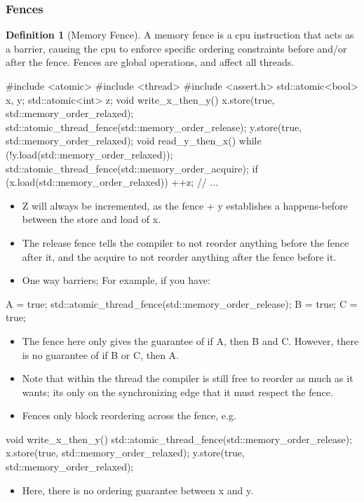 \documentclass[11pt, a4paper]{article}
\theoremstyle{definition}
\newtheorem{definition}[theorem]{Definition}
\theoremstyle{remark}
\begin{document}
\subsubsection{Fences}
\begin{definition}[Memory Fence]
A memory fence is a cpu instruction that acts as a barrier, causing the cpu to enforce specific ordering constraints before and/or after the fence. Fences are global operations, and affect all threads.
\end{definition}
\begin{cppcode}
#include <atomic>
#include <thread>
#include <assert.h>
std::atomic<bool> x, y;
std::atomic<int> z;
void write_x_then_y() {
    x.store(true, std::memory_order_relaxed);
    std::atomic_thread_fence(std::memory_order_release);
    y.store(true, std::memory_order_relaxed);
}
void read_y_then_x() {
    while (!y.load(std::memory_order_relaxed));
    std::atomic_thread_fence(std::memory_order_acquire);
    if (x.load(std::memory_order_relaxed)) ++z;
}
// ...
\end{cppcode}
\begin{itemize}
    \item Z will always be incremented, as the fence + y establishes a happens-before between the store and load of x.
    \item The release fence tells the compiler to not reorder anything before the fence after it, and the acquire to not reorder anything after the fence before it.
    \item One way barriers; For example, if you have:
\end{itemize}
\begin{cppcode}
A = true;
std::atomic_thread_fence(std::memory_order_release);
B = true;
C = true;
\end{cppcode}
\begin{itemize}
    \item The fence here only gives the guarantee of if A, then B and C. However, there is no guarantee of if B or C, then A. 
    \item Note that within the thread the compiler is still free to reorder as much as it wants; its only on the synchronizing edge that it must respect the fence.
    \item Fences only block reordering across the fence, e.g.
\end{itemize}
\begin{cppcode}
void write_x_then_y() {
    std::atomic_thread_fence(std::memory_order_release);
    x.store(true, std::memory_order_relaxed);
    y.store(true, std::memory_order_relaxed);
}
\end{cppcode}
\begin{itemize}
    \item Here, there is no ordering guarantee between x and y.
\end{itemize}
\end{document}
